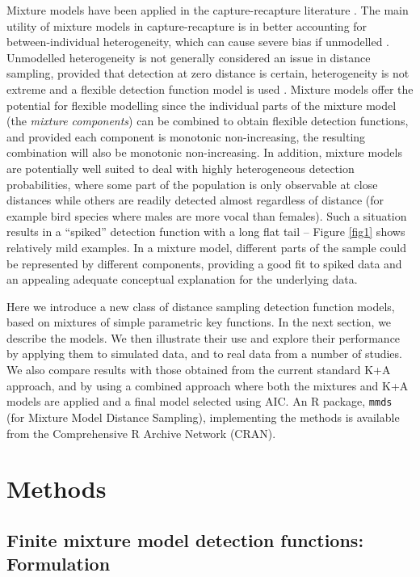 \documentclass[10pt]{article}
\begin{document}
Mixture models have been applied in the capture-recapture literature \cite{Pledger:2000tc, Dorazio:2003uf, Pledger:2005wy, Morgan:2008wy}. The main utility of mixture models in capture-recapture is in better accounting for between-individual heterogeneity, which can cause severe bias if unmodelled \cite{Link:2003wo}. Unmodelled heterogeneity is not generally considered an issue in distance sampling, provided that detection at zero distance is certain, heterogeneity is not extreme and a flexible detection function model is used \cite[Section 11.12]{Buckland:2004ts}. Mixture models offer the potential for flexible modelling since the individual parts of the mixture model (the \textit{mixture components}) can be combined to obtain flexible detection functions, and provided each component is monotonic non-increasing, the resulting combination will also be monotonic non-increasing. In addition, mixture models are potentially well suited to deal with highly heterogeneous detection probabilities, where some part of the population is only observable at close distances while others are readily detected almost regardless of distance (for example bird species where males are more vocal than females). Such a situation results in a ``spiked'' detection function with a long flat tail -- Figure \ref{fig1} shows relatively mild examples. In a mixture model, different parts of the sample could be represented by different components, providing a good fit to spiked data and an appealing adequate conceptual explanation for the underlying data.

Here we introduce a new class of distance sampling detection function models, based on mixtures of simple parametric key functions.  In the next section, we describe the models.  We then illustrate their use and explore their performance by applying them to simulated data, and to real data from a number of studies. We also compare results with those obtained from the current standard K+A approach, and by using a combined approach where both the mixtures and K+A models are applied and a final model selected using AIC. An \textsf{R} \cite{Team:2013wf} package, \texttt{mmds} (for Mixture Model Distance Sampling), implementing the methods is available from the Comprehensive R Archive Network (CRAN).

\section*{Methods}

\subsection*{Finite mixture model detection functions: Formulation}
\end{document}
